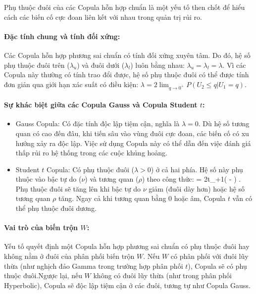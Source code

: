 Phụ thuộc đuôi của các Copula hỗn hợp chuẩn là một yếu tố then chốt để hiểu cách các biến cố cực đoan liên kết với nhau trong quản trị rủi ro.

\paragraph{Đặc tính chung và tính đối xứng:}
Các Copula hỗn hợp phương sai chuẩn có tính đối xứng xuyên tâm. Do đó, hệ số phụ thuộc đuôi trên ($\lambda_u$) và đuôi dưới ($\lambda_l$) luôn bằng nhau: $\lambda_u = \lambda_l = \lambda$. Vì các Copula này thường có tính trao đổi được, hệ số phụ thuộc đuôi có thể được tính đơn giản qua giới hạn xác suất có điều kiện: $\lambda = 2 \lim_{q \to 0^+} P(U_2 \le q | U_1 = q)$.

\paragraph{Sự khác biệt giữa các Copula Gauss và Copula Student $t$:}
\begin{itemize}
    \item Gauss Copula: Có đặc tính độc lập tiệm cận, nghĩa là $\lambda = 0$. Dù hệ số tương quan có cao đến đâu, khi tiến sâu vào vùng đuôi cực đoan, các biến cố có xu hướng xảy ra độc lập. Việc sử dụng Copula này có thể dẫn đến việc đánh giá thấp rủi ro hệ thống trong các cuộc khủng hoảng.
    \item Student $t$ Copula: Có phụ thuộc đuôi ($\lambda > 0$) ở cả hai phía. Hệ số này phụ thuộc vào bậc tự do ($\nu$) và tương quan ($\rho$) theo công thức:
    \bea
    \lambda = 2t_{\nu+1}\left( - \right) .
    \eea
Phụ thuộc đuôi sẽ tăng lên khi bậc tự do $\nu$ giảm (đuôi dày hơn) hoặc hệ số tương quan $\rho$ tăng. Ngay cả khi tương quan bằng $0$ hoặc âm, Copula $t$ vẫn có thể phụ thuộc đuôi dương.
\end{itemize}
\cite{luo2010tcopula}                                    
\paragraph{Vai trò của biến trộn $W$:}
Yếu tố quyết định một Copula hỗn hợp phương sai chuẩn có phụ thuộc đuôi hay không nằm ở đuôi của phân phối biến trộn $W$. Nếu $W$ có phân phối với đuôi lũy thừa (như nghịch đảo Gamma trong trường hợp phân phối $t$), Copula sẽ có phụ thuộc đuôi.Ngược lại, nếu $W$ không có đuôi lũy thừa (như trong phân phối Hyperbolic), Copula sẽ độc lập tiệm cận ở các đuôi, tương tự như Copula Gauss.

